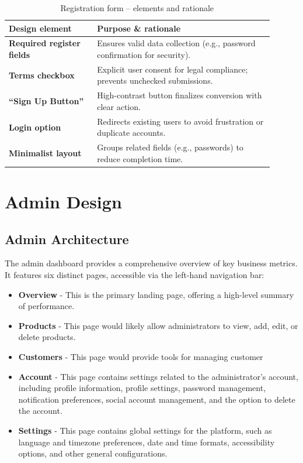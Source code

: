 \documentclass[12pt]{article}
\begin{document}
	\begin{table}[H]
		\centering
		\caption{Registration form – elements and rationale}
		\label{tab:register-elements}
		\begin{tabular}{p{0.30\linewidth} p{0.60\linewidth}}
			\toprule
			\textbf{Design element} & \textbf{Purpose \& rationale} \\ \midrule
			\textbf{Required register fields}   & Ensures valid data collection (e.g., password confirmation for security). \\
			\textbf{Terms checkbox}          	& Explicit user consent for legal compliance; prevents unchecked submissions. \\
			\textbf{``Sign Up Button''}      	& High-contrast button finalizes conversion with clear action. \\
			\textbf{Login option}            	& Redirects existing users to avoid frustration or duplicate accounts. \\
			\textbf{Minimalist layout}       	& Groups related fields (e.g., passwords) to reduce completion time. \\
			\bottomrule
		\end{tabular}
	\end{table}

	
	\section{Admin Design}\label{sec:admin-design}
	\vspace{0.3cm}
	
	
	\subsection{Admin Architecture}\label{subsec:admin-architecture}
	The admin dashboard provides a comprehensive overview of key business metrics. It features six distinct pages, accessible via the left-hand navigation bar:
	\begin{itemize}
		\item \textbf{Overview} - This is the primary landing page, offering a high-level summary of performance.
		\item \textbf{Products} - This page would likely allow administrators to view, add, edit, or delete products.
		\item \textbf{Customers} - This page would provide tools for managing customer
		\item \textbf{Account} - This page contains settings related to the administrator's account, including profile information, profile settings, password management, notification preferences, social account management, and the option to delete the account.
		\item \textbf{Settings} - This page contains global settings for the platform, such as language and timezone preferences, date and time formats, accessibility options, and other general configurations.
	\end{itemize}
	\newpage
\end{document}
